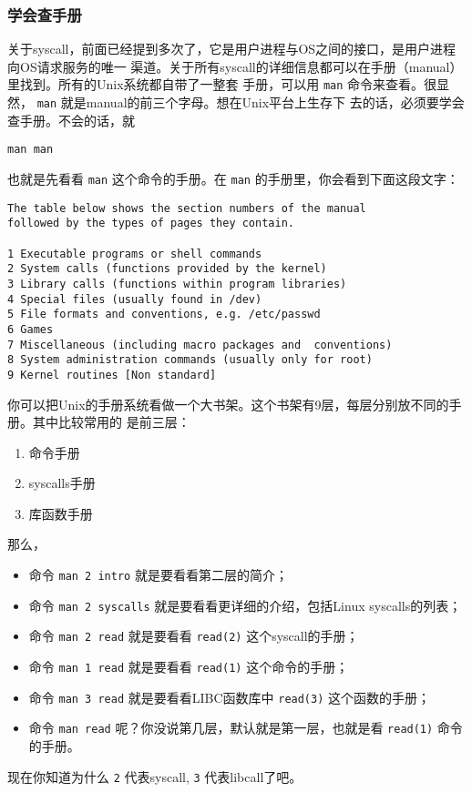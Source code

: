 \documentclass{wx672ctexart}
\newcommand\mpic[1]{%
  \marginpar{\texttt{[image: thumbnails/\#1]}}}
\begin{document}
\subsubsection{学会查手册}
\label{sec:org069c3d8}

\mpic{pg_0037}关于syscall，前面已经提到多次了，它是用户进程与OS之间的接口，是用户进程向OS请求服务的唯一
渠道。关于所有syscall的详细信息都可以在手册（manual）里找到。所有的Unix系统都自带了一整套
手册，可以用 \texttt{man} 命令来查看。很显然， \texttt{man} 就是manual的前三个字母。想在Unix平台上生存下
去的话，必须要学会查手册。不会的话，就
\begin{verbatim}
man man
\end{verbatim}
也就是先看看 \texttt{man} 这个命令的手册。在 \texttt{man} 的手册里，你会看到下面这段文字：

\begin{verbatim}
The table below shows the section numbers of the manual
followed by the types of pages they contain.

1 Executable programs or shell commands
2 System calls (functions provided by the kernel)
3 Library calls (functions within program libraries)
4 Special files (usually found in /dev)
5 File formats and conventions, e.g. /etc/passwd
6 Games
7 Miscellaneous (including macro packages and  conventions)
8 System administration commands (usually only for root)
9 Kernel routines [Non standard]
\end{verbatim}

你可以把Unix的手册系统看做一个大书架。这个书架有9层，每层分别放不同的手册。其中比较常用的
是前三层：
\begin{enumerate}
\item 命令手册
\item syscalls手册
\item 库函数手册
\end{enumerate}

那么，
\begin{itemize}
\item 命令 \texttt{man 2 intro} 就是要看看第二层的简介；
\item 命令 \texttt{man 2 syscalls} 就是要看看更详细的介绍，包括Linux syscalls的列表；
\item 命令 \texttt{man 2 read} 就是要看看 \texttt{read(2)} 这个syscall的手册；
\item 命令 \texttt{man 1 read} 就是要看看 \texttt{read(1)} 这个命令的手册；
\item 命令 \texttt{man 3 read} 就是要看看LIBC函数库中 \texttt{read(3)} 这个函数的手册；
\item 命令 \texttt{man read} 呢？你没说第几层，默认就是第一层，也就是看 \texttt{read(1)} 命令的手册。
\end{itemize}
现在你知道为什么 \texttt{2} 代表syscall, \texttt{3} 代表libcall了吧。
\end{document}
